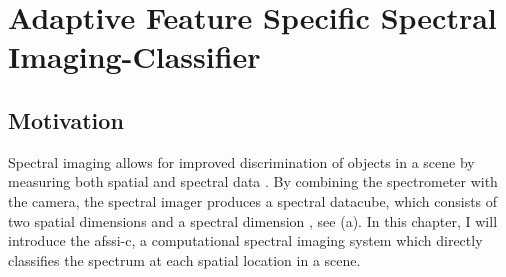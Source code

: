 \chapter{Adaptive Feature Specific Spectral Imaging-Classifier}\label{chap:Afssic}


\section{Motivation}

Spectral imaging allows for improved discrimination of objects in a scene by measuring both spatial and spectral data \cite{chang2003hyperspectral, ibrahim2010spectral, shaw2003spectral}. By combining the spectrometer with the camera, the spectral imager produces a spectral datacube, which consists of two spatial dimensions and a spectral dimension \cite{garini2006spectral,eismann2012hyperspectral}, see (a).  In this chapter, I will introduce the \acrfull{afssi-c}, a computational spectral imaging system which directly classifies the spectrum at each spatial location in a scene.

